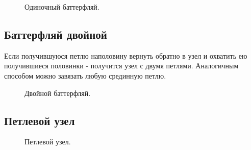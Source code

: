 \begin{figure}[H]\centering
	\subfloat[Результат]{\label{ris:Single_butterfly_3}
	\tcbox[enhanced jigsaw,colframe=black,opacityframe=0.5,opacityback=0.5,height=5cm]
		{\centering
			}
		}
	\caption{Одиночный баттерфляй.}\label{ris:Single_butterfly}
\end{figure}

\subsection{Баттерфляй двойной}

Если получившуюся петлю наполовину вернуть обратно в узел и охватить ею получившиеся половинки - получится узел с двумя петлями. Аналогичным способом можно завязать любую срединную петлю.

\begin{figure}[H]\centering
	\subfloat[Завязывание]{\label{ris:Double_butterfly_1}
	\tcbox[enhanced jigsaw,colframe=black,opacityframe=0.5,opacityback=0.5,height=5.5cm]
		{\centering
			}
		}
\hfil
	\subfloat[Результат]{\label{ris:Double_butterfly_2}
	\tcbox[enhanced jigsaw,colframe=black,opacityframe=0.5,opacityback=0.5,height=5.5cm]
		{\centering
			}
		}
	\caption{Двойной баттерфляй.}\label{ris:Double_butterfly}
\end{figure}


\subsection{Петлевой узел}


\begin{figure}[H]\centering
	\begin{minipage}{1\linewidth}
		\begin{center}
			\tcbox[enhanced jigsaw,colframe=black,opacityframe=0.5,opacityback=0.5]
			{\centering{}}
		\end{center}
	\end{minipage}
\caption{Петлевой узел.}
\label{ris:Petlevoy}
\end{figure}

